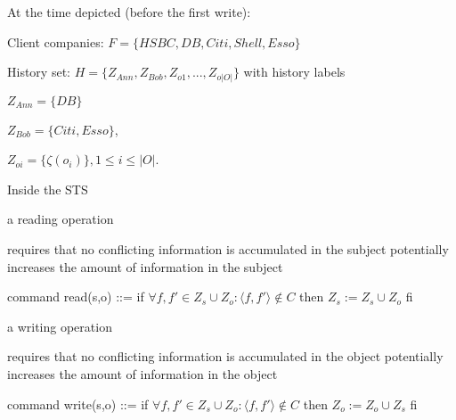 \documentclass[a4paper]{article}
\begin{document}
\begin{multicols}{3}
    \begin{itemize*}
        \item At the time depicted (before the first write):
              \begin{itemize*}
                  \item Client companies: $F=\{HSBC,DB,Citi,Shell,Esso\}$
                  \item History set: $H=\{Z_{Ann},Z_{Bob},Z_{o1} ,...,Z_{o|O|}\}$ with history labels
                        \begin{itemize*}
                            \item $Z_{Ann}=\{DB\}$
                            \item $Z_{Bob}=\{Citi,Esso\}$,
                            \item $Z_{oi}=\{\zeta(o_i)\}, 1\leq i\leq |O|$.
                        \end{itemize*}
              \end{itemize*}
    \end{itemize*}

    Inside the STS
    \begin{itemize*}
        \item a reading operation
              \begin{itemize*}
                  \item requires that no conflicting information is accumulated in the subject potentially increases the amount of information in the subject
                  \item command read(s,o) ::= if $\forall f,f'\in Z_s \cup Z_o:⟨f,f'⟩\not\in C$ then $Z_s:=Z_s\cup Z_o$ fi
              \end{itemize*}
        \item a writing operation
              \begin{itemize*}
                  \item requires that no conflicting information is accumulated in the object potentially increases the amount of information in the object
                  \item command write(s,o) ::= if $\forall f,f'\in Z_s\cup Z_o:⟨f,f'⟩\not\in C$ then $Z_o:=Z_o\cup Z_s$ fi
              \end{itemize*}
    \end{itemize*}


\end{multicols}
\end{document}
